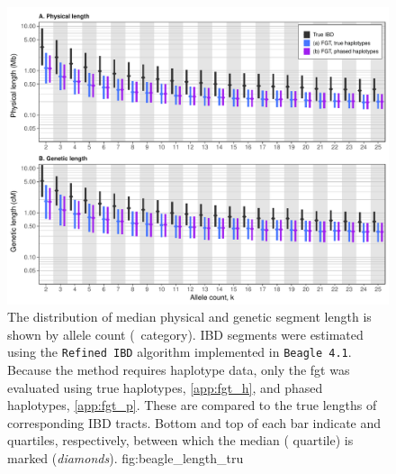 

\begin{figure}[!htb]
\includegraphics[width=\textwidth]{./img/ch3/beagle_length_tru}
{The distribution of median physical and genetic segment length is shown by allele count (\fk{}~category).
IBD segments were estimated using the \texttt{Refined\,IBD} algorithm implemented in \texttt{Beagle~4.1}.
Because the method requires haplotype data, only the \gls{fgt} was evaluated using true haplotypes, \cref{app:fgt_h}, and phased haplotypes, \cref{app:fgt_p}.
These are compared to the true lengths of corresponding IBD tracts.
Bottom and top of each bar indicate  and  quartiles, respectively, between which the median ( quartile) is marked (\emph{diamonds}).}
{fig:beagle_length_tru}
\end{figure}
